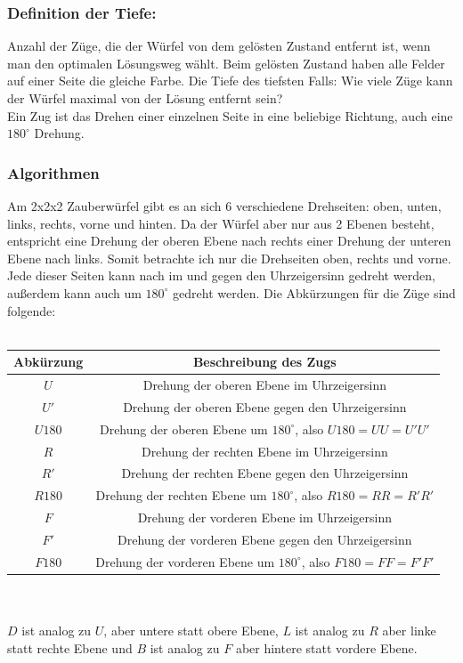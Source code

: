 \documentclass[12pt,a4paper, usenames, dvipsnames]{scrartcl}
\begin{document}
\subsubsection*{Definition der Tiefe:}
Anzahl der Züge, die der Würfel von dem gelösten Zustand entfernt ist, wenn man den optimalen Lösungsweg wählt. Beim gelösten Zustand haben alle Felder auf einer Seite die gleiche Farbe. Die Tiefe des tiefsten Falls: Wie viele Züge kann der Würfel maximal von der Lösung entfernt sein? \\
Ein Zug ist das Drehen einer einzelnen Seite in eine beliebige Richtung, auch eine $180^\circ$ Drehung.

\subsubsection*{Algorithmen}
Am 2x2x2 Zauberwürfel gibt es an sich 6 verschiedene Drehseiten: oben, unten, links, rechts, vorne und hinten. Da der Würfel aber nur aus 2 Ebenen besteht, entspricht eine Drehung der oberen Ebene nach rechts einer Drehung der unteren Ebene nach links. Somit betrachte ich nur die Drehseiten oben, rechts und vorne. \\
Jede dieser Seiten kann nach im und gegen den Uhrzeigersinn gedreht werden, außerdem kann auch um $180^\circ$ gedreht werden. Die Abkürzungen für die Züge sind folgende: \\
\\
\begin{tabular}{|c|c|}
\hline
Abkürzung & Beschreibung des Zugs \\
\hline
\hline
$U$ & Drehung der oberen Ebene im Uhrzeigersinn \\
\hline
$U'$ & Drehung der oberen Ebene gegen den Uhrzeigersinn \\
\hline
$U180$ & Drehung der oberen Ebene um $180^\circ$, also $U180= UU = U'U'$ \\
\hline
$R$ & Drehung der rechten Ebene im Uhrzeigersinn \\
\hline
$R'$ & Drehung der rechten Ebene gegen den Uhrzeigersinn \\
\hline
$R180$ & Drehung der rechten Ebene um $180^\circ$, also $R180= RR = R'R'$ \\
\hline
$F$ & Drehung der vorderen Ebene im Uhrzeigersinn \\
\hline
$F'$ & Drehung der vorderen Ebene gegen den Uhrzeigersinn \\
\hline
$F180$ & Drehung der vorderen Ebene um $180^\circ$, also $F180= FF = F'F'$ \\
\hline
\end{tabular} \\
\\
$D$ ist analog zu $U$, aber untere statt obere Ebene, $L$ ist analog zu $R$ aber linke statt rechte Ebene und $B$ ist analog zu $F$ aber hintere statt vordere Ebene. 
\end{document}
